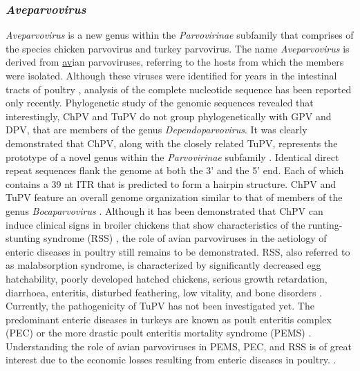
\subsubsection{\textit{Aveparvovirus}}

\textit{Aveparvovirus} is a new genus within the \textit{Parvovirinae} subfamily that comprises of the species chicken parvovirus and turkey parvovirus. The name \textit{Aveparvovirus} is derived from \underline{av}ian parvoviruses, referring to the hosts from which the members were isolated. Although these viruses were identified for years in the intestinal tracts of poultry \cite{pmid18766849, pmid6847550, pmid2995561}, analysis of the complete nucleotide sequence has been reported only recently. Phylogenetic study of the genomic sequences revealed that interestingly, ChPV and TuPV do not group phylogenetically with GPV and DPV, that are members of the genus \textit{Dependoparvovirus}. It was clearly demonstrated that ChPV, along with the closely related TuPV, represents the prototype of a novel genus within the \textit{Parvovirinae} subfamily \cite{pmid25510852, pmid18622862}. Identical direct repeat sequences flank the genome at both the 3' and the 5' end. Each of which contains a 39 nt ITR that is predicted to form a hairpin structure. ChPV and TuPV feature an overall genome organization similar to that of members of the genus \textit{Bocaparvovirus} \cite{pmid20097398}. 
Although it has been demonstrated that ChPV can induce clinical signs in broiler chickens that show characteristics of the runting-stunting syndrome (RSS) \cite{pmid18766892}, the role of avian parvoviruses in the aetiology of enteric diseases in poultry still remains to be demonstrated. RSS, also referred to as malabsorption syndrome, is characterized by significantly decreased egg hatchability, poorly developed hatched chickens, serious growth retardation, diarrhoea, enteritis, disturbed feathering, low vitality, and bone disorders \cite{pmid7150147, pmid6281962, pmid8363509}. Currently, the pathogenicity of TuPV has not been investigated yet. The predominant enteric diseases in turkeys are known as poult enteritis complex (PEC) \cite{pmid10935280} or the more drastic poult enteritis mortality syndrome (PEMS) \cite{PEMS}. Understanding the role of avian parvoviruses in PEMS, PEC, and RSS is of great interest due to the economic losses resulting from enteric diseases in poultry. \cite{pmid18622862}. 
  
